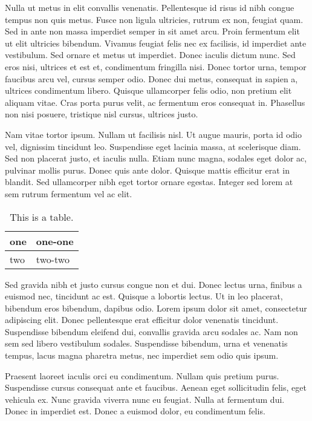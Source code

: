 \documentclass[preprint, review,12pt]{elsarticle}
\begin{document}
Nulla ut metus in elit convallis venenatis. Pellentesque id risus id nibh congue tempus non quis metus. Fusce non ligula ultricies, rutrum ex non, feugiat quam. Sed in ante non massa imperdiet semper in sit amet arcu. Proin fermentum elit ut elit ultricies bibendum. Vivamus feugiat felis nec ex facilisis, id imperdiet ante vestibulum. Sed ornare et metus ut imperdiet. Donec iaculis dictum nunc. Sed eros nisi, ultrices et est et, condimentum fringilla nisi. Donec tortor urna, tempor faucibus arcu vel, cursus semper odio. Donec dui metus, consequat in sapien a, ultrices condimentum libero. Quisque ullamcorper felis odio, non pretium elit aliquam vitae. Cras porta purus velit, ac fermentum eros consequat in. Phasellus non nisi posuere, tristique nisl cursus, ultrices justo.

Nam vitae tortor ipsum. Nullam ut facilisis nisl. Ut augue mauris, porta id odio vel, dignissim tincidunt leo. Suspendisse eget lacinia massa, at scelerisque diam. Sed non placerat justo, et iaculis nulla. Etiam nunc magna, sodales eget dolor ac, pulvinar mollis purus. Donec quis ante dolor. Quisque mattis efficitur erat in blandit. Sed ullamcorper nibh eget tortor ornare egestas. Integer sed lorem at sem rutrum fermentum vel ac elit.

\begin{table}
  \centering
  \begin{tabular}{ll}\toprule
    one & one-one \\\midrule
    two & two-two\\\bottomrule
  \end{tabular}
  \caption{This is a table.}
\end{table}

Sed gravida nibh et justo cursus congue non et dui. Donec lectus urna, finibus a euismod nec, tincidunt ac est. Quisque a lobortis lectus. Ut in leo placerat, bibendum eros bibendum, dapibus odio. Lorem ipsum dolor sit amet, consectetur adipiscing elit. Donec pellentesque erat efficitur dolor venenatis tincidunt. Suspendisse bibendum eleifend dui, convallis gravida arcu sodales ac. Nam non sem sed libero vestibulum sodales. Suspendisse bibendum, urna et venenatis tempus, lacus magna pharetra metus, nec imperdiet sem odio quis ipsum.

Praesent laoreet iaculis orci eu condimentum. Nullam quis pretium purus. Suspendisse cursus consequat ante et faucibus. Aenean eget sollicitudin felis, eget vehicula ex. Nunc gravida viverra nunc eu feugiat. Nulla at fermentum dui. Donec in imperdiet est. Donec a euismod dolor, eu condimentum felis. \cite{data}
\end{document}
